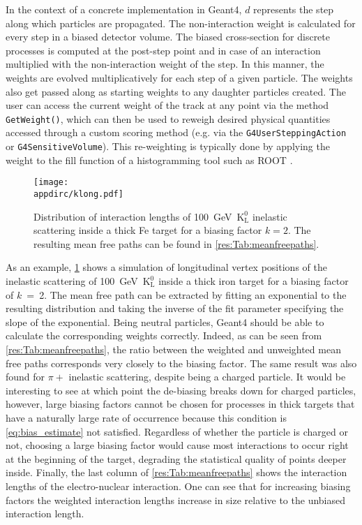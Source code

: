 %
In the context of a concrete implementation in Geant4, $d$ represents the step along which particles are propagated. The non-interaction weight is calculated for every step in a biased detector volume. The biased cross-section for discrete processes is computed at the post-step point and in case of an interaction multiplied with the non-interaction weight of the step. In this manner, the weights are evolved multiplicatively for each step of a given particle. The weights also get passed along as starting weights to any daughter particles created. The user can access the current weight of the track at any point via the method \verb|GetWeight()|, which can then be used to reweigh desired physical quantities accessed through a custom scoring method (e.g. via the \verb|G4UserSteppingAction| or \verb|G4SensitiveVolume|). This re-weighting is typically done by applying the weight to the fill function of a histogramming tool such as ROOT \cite{root}.

\begin{figure}[htb]
  \centering
  \texttt{[image: \\appdirc/klong.pdf]}
  \caption[Distribution of interaction lengths of $\mathrm{K^0_L}$ inelastic scattering.] {Distribution of interaction lengths of 100~GeV~$\mathrm{K^0_L}$ inelastic scattering inside a thick Fe target for a biasing factor $k=2$. The resulting mean free paths can be found in \ref{res:Tab:meanfreepaths}.}
  \label{res:fig:klong}
\end{figure}

As an example, \ref{res:fig:klong} shows a simulation of longitudinal vertex positions of the inelastic scattering of 100~GeV~$\mathrm{K^0_L}$ inside a thick iron target for a biasing factor of $k$~=~2. The mean free path can be extracted by fitting an exponential to the resulting distribution and taking the inverse of the fit parameter specifying the slope of the exponential. Being neutral particles, Geant4 should be able to calculate the corresponding weights correctly. Indeed, as can be seen from \ref{res:Tab:meanfreepaths}, the ratio between the weighted and unweighted mean free paths corresponds very closely to the biasing factor. The same result was also found for $\pi+$ inelastic scattering, despite being a charged particle. It would be interesting to see at which point the de-biasing breaks down for charged particles, however, large biasing factors cannot be chosen for processes in thick targets that have a naturally large rate of occurrence because this condition is \ref{eq:bias_estimate} not satisfied. Regardless of whether the particle is charged or not, choosing a large biasing factor would cause most interactions to occur right at the beginning of the target, degrading the statistical quality of points deeper inside. Finally, the last column of \ref{res:Tab:meanfreepaths} shows the interaction lengths of the electro-nuclear interaction. One can see that for increasing biasing factors the weighted interaction lengths increase in size relative to the unbiased interaction length.


